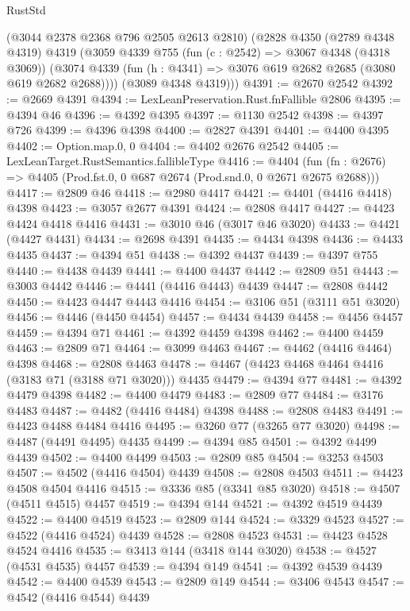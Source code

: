 \begin{lexlean}{RustStd}
\begin{coremodule}
      (@3044 @2378 @2368 @796 @2505 @2613 @2810)
      (@2828
        @4350
        (@2789 @4348 @4319)
        @4319
        (@3059
          @4339
          @755
          (fun (c : @2542) => @3067 @4348 (@4318 @3069))
          (@3074 @4339 (fun (h : @4341) => @3076 @619 @2682 @2685 (@3080 @619 @2682 @2688))))
        (@3089 @4348 @4319)))
@4391 := @2670 @2542
@4392 := @2669 @4391
@4394 := LexLeanPreservation.Rust.fnFallible @2806
@4395 := @4394 @46
@4396 := @4392 @4395
@4397 := @1130 @2542
@4398 := @4397 @726
@4399 := @4396 @4398
@4400 := @2827 @4391
@4401 := @4400 @4395
@4402 := Option.map.{0, 0}
@4404 := @4402 @2676 @2542
@4405 := LexLeanTarget.RustSemantics.fallibleType
@4416 := @4404
    (fun (fn : @2676) => @4405 (Prod.fst.{0, 0} @687 @2674 (Prod.snd.{0, 0} @2671 @2675 @2688)))
@4417 := @2809 @46
@4418 := @2980 @4417
@4421 := @4401 (@4416 @4418) @4398
@4423 := @3057 @2677 @4391
@4424 := @2808 @4417
@4427 := @4423 @4424 @4418 @4416
@4431 := @3010 @46 (@3017 @46 @3020)
@4433 := @4421 (@4427 @4431)
@4434 := @2698 @4391
@4435 := @4434 @4398
@4436 := @4433 @4435
@4437 := @4394 @51
@4438 := @4392 @4437
@4439 := @4397 @755
@4440 := @4438 @4439
@4441 := @4400 @4437
@4442 := @2809 @51
@4443 := @3003 @4442
@4446 := @4441 (@4416 @4443) @4439
@4447 := @2808 @4442
@4450 := @4423 @4447 @4443 @4416
@4454 := @3106 @51 (@3111 @51 @3020)
@4456 := @4446 (@4450 @4454)
@4457 := @4434 @4439
@4458 := @4456 @4457
@4459 := @4394 @71
@4461 := @4392 @4459 @4398
@4462 := @4400 @4459
@4463 := @2809 @71
@4464 := @3099 @4463
@4467 := @4462 (@4416 @4464) @4398
@4468 := @2808 @4463
@4478 := @4467 (@4423 @4468 @4464 @4416 (@3183 @71 (@3188 @71 @3020))) @4435
@4479 := @4394 @77
@4481 := @4392 @4479 @4398
@4482 := @4400 @4479
@4483 := @2809 @77
@4484 := @3176 @4483
@4487 := @4482 (@4416 @4484) @4398
@4488 := @2808 @4483
@4491 := @4423 @4488 @4484 @4416
@4495 := @3260 @77 (@3265 @77 @3020)
@4498 := @4487 (@4491 @4495) @4435
@4499 := @4394 @85
@4501 := @4392 @4499 @4439
@4502 := @4400 @4499
@4503 := @2809 @85
@4504 := @3253 @4503
@4507 := @4502 (@4416 @4504) @4439
@4508 := @2808 @4503
@4511 := @4423 @4508 @4504 @4416
@4515 := @3336 @85 (@3341 @85 @3020)
@4518 := @4507 (@4511 @4515) @4457
@4519 := @4394 @144
@4521 := @4392 @4519 @4439
@4522 := @4400 @4519
@4523 := @2809 @144
@4524 := @3329 @4523
@4527 := @4522 (@4416 @4524) @4439
@4528 := @2808 @4523
@4531 := @4423 @4528 @4524 @4416
@4535 := @3413 @144 (@3418 @144 @3020)
@4538 := @4527 (@4531 @4535) @4457
@4539 := @4394 @149
@4541 := @4392 @4539 @4439
@4542 := @4400 @4539
@4543 := @2809 @149
@4544 := @3406 @4543
@4547 := @4542 (@4416 @4544) @4439

\end{coremodule}
\end{lexlean}
